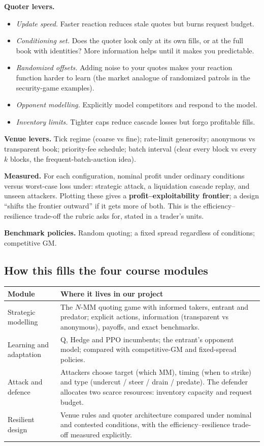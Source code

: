 \documentclass[11pt]{article}
\begin{document}
\textbf{Quoter levers.}
\begin{itemize}
\item \emph{Update speed.} Faster reaction reduces stale quotes but burns request budget.
\item \emph{Conditioning set.} Does the quoter look only at its own fills, or at the full book with identities? More information helps until it makes you predictable.
\item \emph{Randomized offsets.} Adding noise to your quotes makes your reaction function harder to learn (the market analogue of randomized patrols in the security-game examples).
\item \emph{Opponent modelling.} Explicitly model competitors and respond to the model.
\item \emph{Inventory limits.} Tighter caps reduce cascade losses but forgo profitable fills.
\end{itemize}
\textbf{Venue levers.} Tick regime (coarse vs fine); rate-limit generosity; anonymous vs transparent book; priority-fee schedule; batch interval (clear every block vs every $k$ blocks, the frequent-batch-auction idea).

\textbf{Measured.} For each configuration, nominal profit under ordinary conditions versus worst-case loss under: strategic attack, a liquidation cascade replay, and unseen attackers. Plotting these gives a \textbf{profit--exploitability frontier}; a design ``shifts the frontier outward'' if it gets more of both. This is the efficiency--resilience trade-off the rubric asks for, stated in a trader's units.

\textbf{Benchmark policies.} Random quoting; a fixed spread regardless of conditions; competitive GM.

\subsection{How this fills the four course modules}
\begin{center}
\begin{tabular}{p{3.2cm}p{11cm}}
\toprule
Module & Where it lives in our project\\
\midrule
Strategic modelling & The $N$-MM quoting game with informed takers, entrant and predator; explicit actions, information (transparent vs anonymous), payoffs, and exact benchmarks.\\
Learning and adaptation & Q, Hedge and PPO incumbents; the entrant's opponent model; compared with competitive-GM and fixed-spread policies.\\
Attack and defence & Attackers choose target (which MM), timing (when to strike) and type (undercut / steer / drain / predate). The defender allocates two scarce resources: inventory capacity and request budget.\\
Resilient design & Venue rules and quoter architecture compared under nominal and contested conditions, with the efficiency--resilience trade-off measured explicitly.\\
\bottomrule
\end{tabular}
\end{center}
\end{document}
